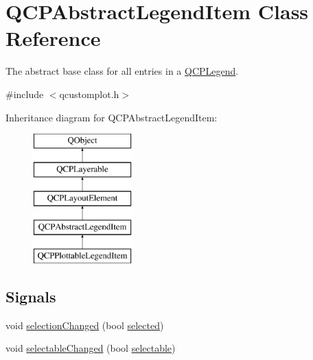 \hypertarget{class_q_c_p_abstract_legend_item}{}\section{Q\+C\+P\+Abstract\+Legend\+Item Class Reference}
\label{class_q_c_p_abstract_legend_item}


The abstract base class for all entries in a \mbox{\hyperlink{class_q_c_p_legend}{Q\+C\+P\+Legend}}.  




{\ttfamily \#include $<$qcustomplot.\+h$>$}

Inheritance diagram for Q\+C\+P\+Abstract\+Legend\+Item\+:\begin{figure}[H]
\begin{center}
\leavevmode
\includegraphics[height=5.000000cm]{d9/d2f/class_q_c_p_abstract_legend_item}
\end{center}
\end{figure}
\subsection*{Signals}
\begin{DoxyCompactItemize}
\item 
void \mbox{\hyperlink{class_q_c_p_abstract_legend_item_a7cb61fdfbaf69c590bacb8f9e7099d9e}{selection\+Changed}} (bool \mbox{\hyperlink{class_q_c_p_abstract_legend_item_adf427dbb05d5f1a8e84c6abcb05becdf}{selected}})
\item 
void \mbox{\hyperlink{class_q_c_p_abstract_legend_item_abc4d779b938cc9235f9196737dbaa6bd}{selectable\+Changed}} (bool \mbox{\hyperlink{class_q_c_p_abstract_legend_item_af054a668038bcd7e35a35a07d1e79a23}{selectable}})
\end{DoxyCompactItemize}
